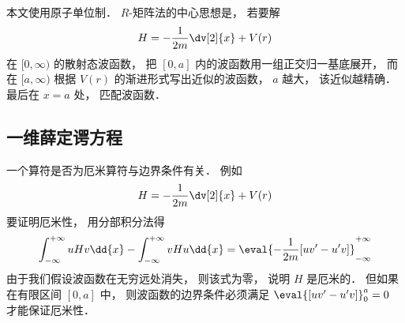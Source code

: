 

本文使用原子单位制． $R$-矩阵法的中心思想是， 若要解
\begin{equation}
H = -\frac{1}{2m}\dv[2]{x} + V(r)
\end{equation}
在 $[0, \infty)$ 的散射态波函数， 把 $[0,a]$ 内的波函数用一组正交归一基底展开， 而在 $[a,\infty)$ 根据 $V(r)$ 的渐进形式写出近似的波函数， $a$ 越大， 该近似越精确． 最后在 $x=a$ 处， 匹配波函数．

\subsection{一维薛定谔方程}
一个算符是否为厄米算符与边界条件有关． 例如
\begin{equation}
H = -\frac{1}{2m}\dv[2]{x} + V(r)
\end{equation}
要证明厄米性， 用分部积分法得
\begin{equation}\label{Rmat_eq1}
\int_{-\infty}^{+\infty} uHv\dd{x} - \int_{-\infty}^{+\infty} vHu\dd{x}
= \eval{-\frac{1}{2m}[uv' - u'v]}_{-\infty}^{+\infty}
\end{equation}
由于我们假设波函数在无穷远处消失， 则该式为零， 说明 $H$ 是厄米的． 但如果在有限区间 $[0, a]$ 中， 则波函数的边界条件必须满足 $\eval{[uv' - u'v]}_{0}^{a} = 0$ 才能保证厄米性．

